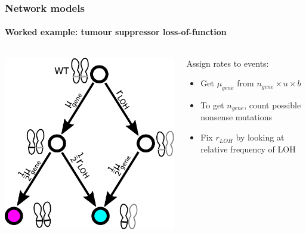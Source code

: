 \documentclass{beamer}
\begin{document}
\begin{frame}
    \frametitle{Network models}
    \framesubtitle{Worked example: tumour suppressor loss-of-function}
    \begin{columns}
        \begin{column}{0.5\textwidth}
        \includegraphics[width=\textwidth]{figures/diagram4c}
        \end{column}
        \begin{column}{0.5\textwidth}
            Assign rates to events:
        \begin{itemize}
            \item Get $\mu_{gene}$ from $n_{gene} \times u \times b$
            \item To get $n_{gene}$, count possible nonsense mutations
            \item Fix $r_{LOH}$ by looking at relative frequency of LOH
        \end{itemize}
        \end{column}
    \end{columns}
\end{frame}
\end{document}
